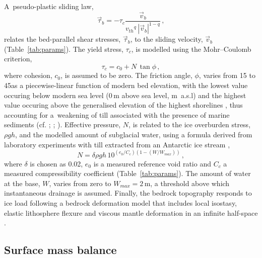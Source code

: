 \documentclass[tc]{copernicus}
\begin{document}
A~pseudo-plastic sliding law,
\begin{equation}
    \label{eqn:pseudoplastic}
    \vec{\tau}_b = -\tau_c \frac{\vec{v}_b}{{v_{th}}^q\,|\vec{v}_b|^{1-q}} \,,
\end{equation}
relates the bed-parallel shear stresses, $\vec{\tau}_b$, to the sliding
velocity, $\vec{v}_b$ (Table~\ref{tab:params}).
The yield stress, $\tau_c$,
is modelled using the Mohr--Coulomb criterion,
\begin{equation}
   \tau_c = c_0 + N\,\tan{\phi} \,,
\end{equation}
where cohesion, $c_0$, is assumed to be zero. The friction angle, $\phi$,
varies from 15 to 45\degree as a piecewise-linear function of modern bed
elevation, with the lowest value occuring below modern sea level (0\,m above
sea level, m~a.s.l) and the highest value occuring above the generalised
elevation of the highest shorelines
\citep[200\,m~a.s.l.,][Fig.~5]{Clague.1981}, thus accounting for
a~weakening of till associated with the presence of marine sediments
(cf. \citealp{Martin.etal.2011}; \citealp[supplement]{Aschwanden.etal.2013};
\citealp{PISM-authors.2014}). Effective pressure, $N$,
is related to the ice overburden stress, $\rho gh$, and the modelled amount of
subglacial water, using a formula derived from laboratory experiments with till
extracted from an Antarctic ice stream \citep{Tulaczyk.etal.2000,
Bueler.Pelt.2014},
\begin{equation}
    N = \delta \rho gh \, 10^{(e_0/C_c) (1 - (W/W_{max}))} \,,
\end{equation}
where $\delta$ is chosen as 0.02, $e_0$ is a measured reference void ratio and
$C_c$ a measured compressibility coefficient (Table~\ref{tab:params}). The
amount of water at the base, $W$, varies from zero to $W_{max}=2$\,m, a
threshold above which instantaneous drainage is assumed.
Finally, the bedrock topography responds to ice load
following a bedrock deformation model that includes local isostasy,
elastic lithosphere flexure and viscous mantle deformation in an infinite
half-space
\citep[Table~\ref{tab:params};][]{Lingle.Clark.1985,Bueler.etal.2007}.

\subsection{Surface mass balance}
\label{sec:surface}
\end{document}
